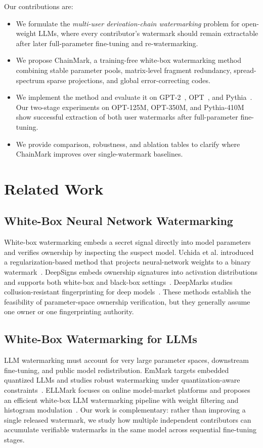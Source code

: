 \documentclass[sigconf]{acmart}
\newcommand{\method}{ChainMark}
\begin{document}
Our contributions are:
\begin{itemize}
  \item We formulate the \emph{multi-user derivation-chain watermarking} problem for open-weight LLMs, where every contributor's watermark should remain extractable after later full-parameter fine-tuning and re-watermarking.
  \item We propose \method, a training-free white-box watermarking method combining stable parameter pools, matrix-level fragment redundancy, spread-spectrum sparse projections, and global error-correcting codes.
  \item We implement the method and evaluate it on GPT-2~\cite{radford2019language}, OPT~\cite{zhang2022opt}, and Pythia~\cite{biderman2023pythia}. Our two-stage experiments on OPT-125M, OPT-350M, and Pythia-410M show successful extraction of both user watermarks after full-parameter fine-tuning.
  \item We provide comparison, robustness, and ablation tables to clarify where \method{} improves over single-watermark baselines.
\end{itemize}

\section{Related Work}

\subsection{White-Box Neural Network Watermarking}
White-box watermarking embeds a secret signal directly into model parameters and verifies ownership by inspecting the suspect model. Uchida et al. introduced a regularization-based method that projects neural-network weights to a binary watermark~\cite{uchida2017embedding}. DeepSigns embeds ownership signatures into activation distributions and supports both white-box and black-box settings~\cite{rouhani2019deepsigns}. DeepMarks studies collusion-resistant fingerprinting for deep models~\cite{chen2019deepmarks}. These methods establish the feasibility of parameter-space ownership verification, but they generally assume one owner or one fingerprinting authority.

\subsection{White-Box Watermarking for LLMs}
LLM watermarking must account for very large parameter spaces, downstream fine-tuning, and public model redistribution. EmMark targets embedded quantized LLMs and studies robust watermarking under quantization-aware constraints~\cite{zhang2024emmark}. ELLMark focuses on online model-market platforms and proposes an efficient white-box LLM watermarking pipeline with weight filtering and histogram modulation~\cite{yuan2025ellmark}. Our work is complementary: rather than improving a single released watermark, we study how multiple independent contributors can accumulate verifiable watermarks in the same model across sequential fine-tuning stages.
\end{document}
